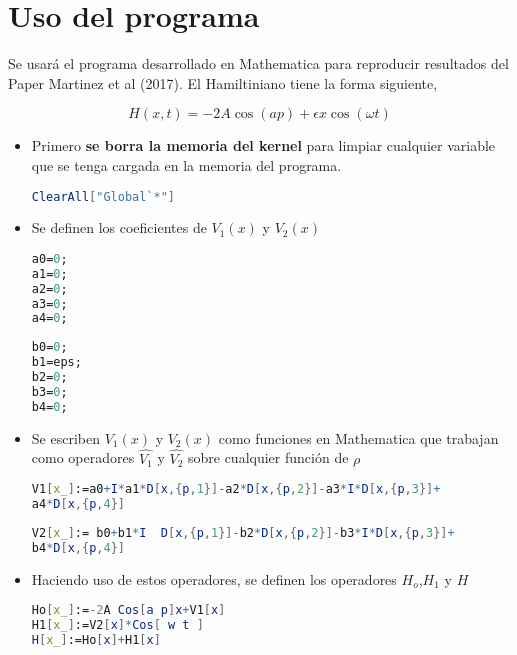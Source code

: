 \section{Uso del programa}

Se usará el programa desarrollado en Mathematica para reproducir resultados del Paper Martinez et al (2017)\cite{martinez2017}.  El Hamiltiniano tiene la forma siguiente,

\begin{equation}
    H(x,t)=-2A\cos(ap)+\epsilon x \cos(\omega t)
\end{equation}

\begin{itemize}
    \item Primero \textbf{se borra la memoria del kernel} para limpiar cualquier variable que se tenga cargada en la memoria del programa.

\begin{lstlisting}[language=Mathematica]
 ClearAll["Global`*"]
\end{lstlisting}

\item Se definen los coeficientes de $V_1(x)$ y $V_2(x)$ 

\begin{lstlisting}[language=Mathematica]
a0=0;
a1=0;
a2=0;
a3=0;
a4=0;
\end{lstlisting}

\begin{lstlisting}[language=Mathematica]
b0=0;
b1=eps;
b2=0;
b3=0;
b4=0;
\end{lstlisting}

 \item Se escriben $V_1(x)$ y $V_2(x)$ como funciones en Mathematica que trabajan como operadores $\hat{V_1}$ y $\hat{V_2}$ sobre cualquier función de $\rho$

\begin{lstlisting}[language=Mathematica]
V1[x_]:=a0+I*a1*D[x,{p,1}]-a2*D[x,{p,2}]-a3*I*D[x,{p,3}]+
a4*D[x,{p,4}]
\end{lstlisting}

\begin{lstlisting}[language=Mathematica]
V2[x_]:= b0+b1*I  D[x,{p,1}]-b2*D[x,{p,2}]-b3*I*D[x,{p,3}]+
b4*D[x,{p,4}]
\end{lstlisting}

\item Haciendo uso de estos operadores, se definen los operadores $H_o$,$H_1$ y $H$

\begin{lstlisting}[language=Mathematica]
Ho[x_]:=-2A Cos[a p]x+V1[x]  
H1[x_]:=V2[x]*Cos[ w t ]
H[x_]:=Ho[x]+H1[x]
\end{lstlisting}


\end{itemize}
